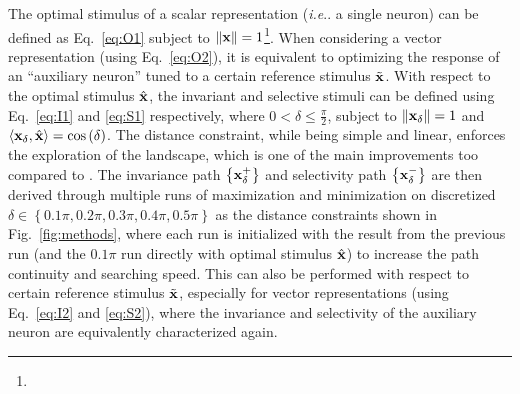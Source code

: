 \documentclass[fleqn]{article} %
\makeatletter
\DeclareRobustCommand\onedot{\futurelet\@let@token\@onedot}
\def\@onedot{\ifx\@let@token.\else.\null\fi\xspace}
\def\ie{\emph{i.e}\onedot} \def\Ie{\emph{I.e}\onedot}
\makeatother
\begin{document}
The optimal stimulus of a scalar representation (\ie a single neuron) can be defined as Eq.~\ref{eq:O1} subject to $\left\| \bf{x} \right\| = 1$\footnote{\expconst}.
When considering a vector representation (using Eq.~\ref{eq:O2}), it is equivalent to optimizing the response of an ``auxiliary neuron'' tuned to a certain reference stimulus $\tilde{\bf{x}}$.
With respect to the optimal stimulus $\hat{\bf{x}}$, the invariant and selective stimuli can be defined using Eq.~\ref{eq:I1} and \ref{eq:S1} respectively, where $0 < \delta \le \frac{\pi}{2}$, subject to $\left\| \bf{x}_{\delta} \right\| = 1$ and $\langle {\bf{x}}_{\delta} , \hat{{\bf{x}}} \rangle = \cos\left(\delta\right)$. 
The distance constraint, while being simple and linear, enforces the exploration of the landscape, which is one of the main improvements too compared to \cite{erhan2010understanding}.
The invariance path $\left\lbrace \bf{x}^{+}_{\delta} \right\rbrace$ and selectivity path $\left\lbrace \bf{x}^{-}_{\delta} \right\rbrace$ are then derived through multiple runs of maximization and minimization on discretized $\delta \in \left\lbrace 0.1\pi, 0.2\pi, 0.3\pi, 0.4\pi, 0.5\pi\right\rbrace$ as the distance constraints shown in Fig.~\ref{fig:methods}, where each run is initialized with the result from the previous run (and the $0.1\pi$ run directly with optimal stimulus $\hat{\bf{x}}$) to increase the path continuity and searching speed.
This can also be performed with respect to certain reference stimulus $\tilde{\bf{x}}$, especially for vector representations (using Eq.~\ref{eq:I2} and \ref{eq:S2}), where the invariance and selectivity of the auxiliary neuron are equivalently characterized again.

\newcommand{\expsettings}{
\Ie 32 channels of filters in the top level's convolution layers, a simple setting yielding reasonable performances.
Following the terminology in recent papers, shallow and deep neurons corresponded to \texttt{pool1} and \texttt{pool2} layers respectively.
Stimulus dimensionalities of the shallow and deep neurons {were} $N=121$ and $441$ (\ie spatially overlapping $11\times11$ and $21\times21$ receptive fields). %
Other minor changes included: nonlinear activations all simplified to \emph{ReLU} \cite{krizhevsky2012imagenet} mode and normalizations all in subtractive mode.
Overall, the architectures were more similar to those in \cite{simonyan2014very}, except pooling operations can be \emph{average}, \emph{squared}, or \emph{max-like} in our case.
}
\end{document}
